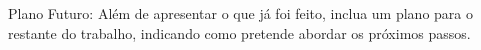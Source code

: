 Plano Futuro: Além de apresentar o que já foi feito, inclua um plano para o restante do trabalho, indicando como pretende abordar os próximos passos.